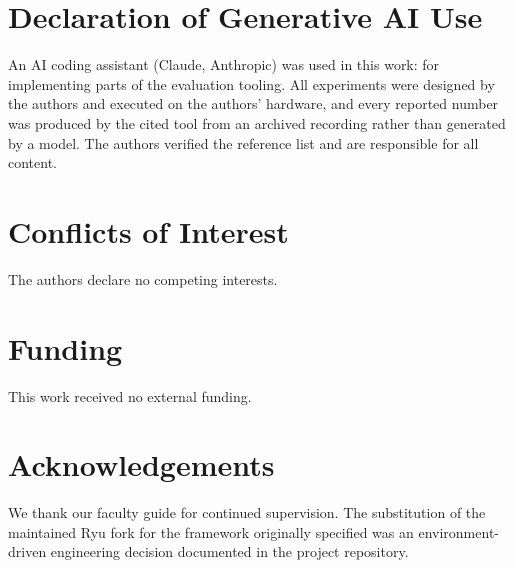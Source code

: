 \documentclass[10pt,twocolumn,letterpaper]{article}
\begin{document}
\section*{Declaration of Generative AI Use}
An AI coding assistant (Claude, Anthropic) was used  in this work:
for implementing parts of the evaluation tooling. All experiments were designed by the
authors and executed on the authors' hardware, and every reported number was
produced by the cited tool from an archived recording rather than generated by
a model. The authors verified the reference list and are responsible for all
content.

\section*{Conflicts of Interest}
The authors declare no competing interests.

\section*{Funding}
This work received no external funding.

\section*{Acknowledgements}
We thank our faculty guide for continued supervision. The substitution of the
maintained Ryu fork for the framework originally specified was an
environment-driven engineering decision documented in the project repository.



\end{document}
